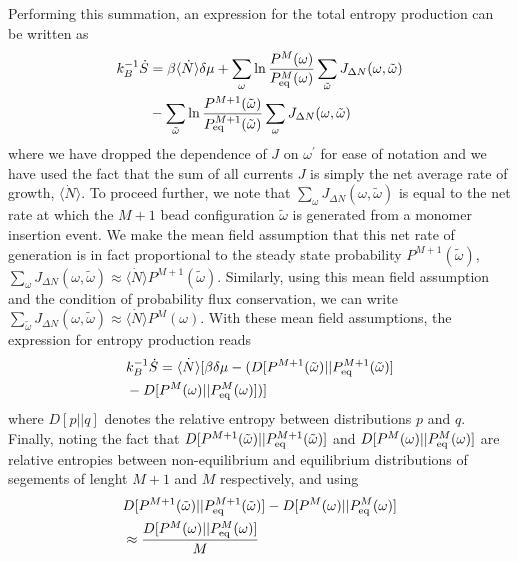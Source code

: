 \documentclass[amsmath,preprintnumbers,10pt,nofootinbib,prl,twocolumn]{revtex4-1}
\begin{document}
Performing this summation, an expression for the total entropy production can be written as 
\begin{equation}
\begin{split}
    k_B^{-1}\dot{S}&=\beta\langle \dot{N} \rangle \delta \mu+\sum_{\omega} \ln\frac{P^M(\omega)}{P_{\rm eq}^M(\omega)}\sum_{\tilde\omega} J_{\Delta N}(\omega,\tilde\omega)\\&-\sum_{\tilde\omega} \ln\frac{P^{M+1}(\tilde\omega)}{P_{\rm eq}^{M+1}(\tilde \omega)}\sum_{\omega} J_{\Delta N}(\omega,\tilde\omega)
\end{split}
\end{equation}
where we have dropped the dependence of $J$ on $\omega^\prime$ for ease of notation and we have used the fact that the sum of all currents $J$ is simply the net average rate of growth, $\langle \dot{N}\rangle$.  
To proceed further, we note that $\sum_{\omega} J_{\Delta N}(\omega,\tilde\omega)$ is equal to the net rate at which the $M+1$ bead configuration $\tilde\omega$ is generated from a monomer insertion event. We make the mean field assumption that this net rate of generation is in fact proportional to the steady state probability $P^{M+1}(\tilde \omega)$, $\sum_{\omega} J_{\Delta N}(\omega,\tilde\omega)\approx \langle \dot{N}\rangle P^{M+1}(\tilde \omega)$. Similarly, using this mean field assumption and the condition of probability flux conservation, we can write $\sum_{\tilde\omega} J_{\Delta N}(\omega,\tilde\omega)\approx \langle \dot{N}\rangle P^M(\omega)$. With these mean field assumptions, the expression for entropy production reads 
\begin{equation}
\label{eq:entprod3}
\begin{split}
    &k_B^{-1}\dot{S}=\dot{\langle N\rangle}\lbrack\beta\delta\mu -(D[P^{M+1}(\tilde \omega)|| P_{\rm eq}^{M+1}(\tilde \omega)]\\
    &-D[P^{M}(\omega)|| P_{\rm eq}^{M}(\omega)])\rbrack
\end{split}
\end{equation}
where $D[p||q]$ denotes the relative entropy between distributions $p$ and $q$. Finally, noting the fact that $D[P^{M+1}(\tilde \omega)|| P_{\rm eq}^{M+1}(\tilde \omega)]$ and $D[P^{M}(\omega)|| P_{\rm eq}^{M}(\omega)]$ are relative entropies between non-equilibrium and equilibrium distributions of segements of lenght $M+1$ and $M$ respectively, and using 
\begin{equation}
\begin{split}
    &D[P^{M+1}(\tilde \omega)|| P_{\rm eq}^{M+1}(\tilde \omega)]-D[P^{M}(\omega)|| P_{\rm eq}^{M}(\omega)]\\&\approx \frac{D[P^{M}(\omega)|| P_{\rm eq}^{M}(\omega)]}{M}
\end{split}
\end{equation}
\end{document}
